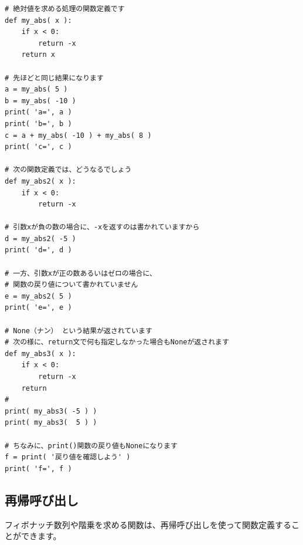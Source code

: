 \documentclass[uplatex,a4paper,11pt,oneside,openany]{jsbook}
\begin{document}
\begin{lstlisting}
# 絶対値を求める処理の関数定義です
def my_abs( x ):
    if x < 0:
        return -x
    return x

# 先ほどと同じ結果になります
a = my_abs( 5 )
b = my_abs( -10 )
print( 'a=', a )
print( 'b=', b )
c = a + my_abs( -10 ) + my_abs( 8 )
print( 'c=', c )

# 次の関数定義では、どうなるでしょう
def my_abs2( x ):
    if x < 0:
        return -x

# 引数xが負の数の場合に、-xを返すのは書かれていますから
d = my_abs2( -5 )
print( 'd=', d )

# 一方、引数xが正の数あるいはゼロの場合に、
# 関数の戻り値について書かれていません
e = my_abs2( 5 )
print( 'e=', e )

# None（ナン） という結果が返されています
# 次の様に、return文で何も指定しなかった場合もNoneが返されます
def my_abs3( x ):
    if x < 0:
        return -x
    return
#
print( my_abs3( -5 ) )
print( my_abs3(  5 ) )

# ちなみに、print()関数の戻り値もNoneになります
f = print( '戻り値を確認しよう' )
print( 'f=', f )
\end{lstlisting}

\subsection{再帰呼び出し}

フィボナッチ数列や階乗を求める関数は、再帰呼び出しを使って関数定義することができます。
\end{document}
